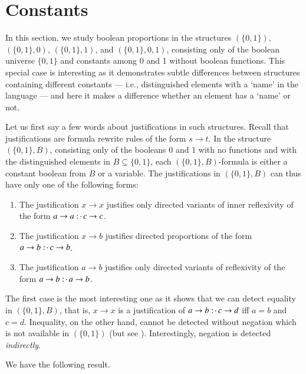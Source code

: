 \documentclass[11pt]{amsart}
\theoremstyle{definition} %
\newcommand{\righttherefore}{:\joinrel\cdot\,}
\begin{document}
\section{Constants}\label{§:Constants}

In this section, we study boolean proportions in the structures $(\{0,1\})$, $(\{0,1\},0)$, $(\{0,1\},1)$, and $(\{0,1\},0,1)$, consisting only of the boolean universe $\{0,1\}$ and constants among 0 and 1 without boolean functions. This special case is interesting as it demonstrates subtle differences between structures containing different constants --- i.e., distinguished elements with a `name' in the language --- and here it makes a difference whether an element has a `name' or not.

Let us first say a few words about justifications in such structures. Recall that justifications are formula rewrite rules of the form $s\to t$. In the structure $(\{0,1\},B)$, consisting only of the booleans $0$ and $1$ with no functions and with the distinguished elements in $B\subseteq\{0,1\}$, each $(\{0,1\},B)$-formula is either a constant boolean from $B$ or a variable. The justifications in $(\{0,1\},B)$ can thus have only one of the following forms:
\begin{enumerate}
	\item The justification $x\to x$ justifies only directed variants of inner reflexivity  of the form $a\to a\righttherefore c\to c$.
	\item The justification $x\to b$ justifies directed proportions of the form $a\to b\righttherefore c\to b$.
	\item The justification $a\to b$ justifies only directed variants of reflexivity  of the form $a\to b\righttherefore a\to b$.
\end{enumerate} The first case is the most interesting one as it shows that we can detect equality in $(\{0,1\},B)$, that is, $x\to x$ is a justification of $a\to b\righttherefore c\to d$ iff $a=b$ and $c=d$. Inequality, on the other hand, cannot be detected without negation which is not available in $(\{0,1\})$ (but see ). Interestingly, negation is detected \textit{indirectly}.

We have the following result.
\end{document}

